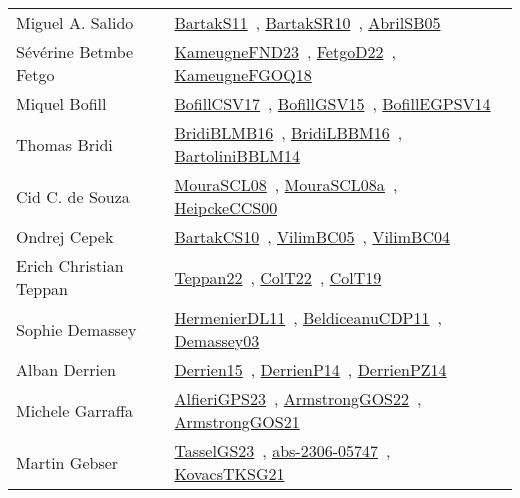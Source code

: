 {\begin{longtable}{p{4cm}p{20cm}}
Miguel A. Salido & \href{works/BartakS11.pdf}{BartakS11}~\cite{BartakS11}, \href{works/BartakSR10.pdf}{BartakSR10}~\cite{BartakSR10}, \href{works/AbrilSB05.pdf}{AbrilSB05}~\cite{AbrilSB05}\\
S{\'{e}}v{\'{e}}rine Betmbe Fetgo & \href{works/KameugneFND23.pdf}{KameugneFND23}~\cite{KameugneFND23}, \href{works/FetgoD22.pdf}{FetgoD22}~\cite{FetgoD22}, \href{works/KameugneFGOQ18.pdf}{KameugneFGOQ18}~\cite{KameugneFGOQ18}\\
Miquel Bofill & \href{works/BofillCSV17.pdf}{BofillCSV17}~\cite{BofillCSV17}, \href{works/BofillGSV15.pdf}{BofillGSV15}~\cite{BofillGSV15}, \href{works/BofillEGPSV14.pdf}{BofillEGPSV14}~\cite{BofillEGPSV14}\\
Thomas Bridi & \href{works/BridiBLMB16.pdf}{BridiBLMB16}~\cite{BridiBLMB16}, \href{works/BridiLBBM16.pdf}{BridiLBBM16}~\cite{BridiLBBM16}, \href{works/BartoliniBBLM14.pdf}{BartoliniBBLM14}~\cite{BartoliniBBLM14}\\
Cid C. de Souza & \href{works/MouraSCL08.pdf}{MouraSCL08}~\cite{MouraSCL08}, \href{works/MouraSCL08a.pdf}{MouraSCL08a}~\cite{MouraSCL08a}, \href{works/HeipckeCCS00.pdf}{HeipckeCCS00}~\cite{HeipckeCCS00}\\
Ondrej Cepek & \href{works/BartakCS10.pdf}{BartakCS10}~\cite{BartakCS10}, \href{works/VilimBC05.pdf}{VilimBC05}~\cite{VilimBC05}, \href{works/VilimBC04.pdf}{VilimBC04}~\cite{VilimBC04}\\
Erich Christian Teppan & \href{works/Teppan22.pdf}{Teppan22}~\cite{Teppan22}, \href{works/ColT22.pdf}{ColT22}~\cite{ColT22}, \href{works/ColT19.pdf}{ColT19}~\cite{ColT19}\\
Sophie Demassey & \href{works/HermenierDL11.pdf}{HermenierDL11}~\cite{HermenierDL11}, \href{works/BeldiceanuCDP11.pdf}{BeldiceanuCDP11}~\cite{BeldiceanuCDP11}, \href{}{Demassey03}~\cite{Demassey03}\\
Alban Derrien & \href{}{Derrien15}~\cite{Derrien15}, \href{works/DerrienP14.pdf}{DerrienP14}~\cite{DerrienP14}, \href{works/DerrienPZ14.pdf}{DerrienPZ14}~\cite{DerrienPZ14}\\
Michele Garraffa & \href{works/AlfieriGPS23.pdf}{AlfieriGPS23}~\cite{AlfieriGPS23}, \href{works/ArmstrongGOS22.pdf}{ArmstrongGOS22}~\cite{ArmstrongGOS22}, \href{works/ArmstrongGOS21.pdf}{ArmstrongGOS21}~\cite{ArmstrongGOS21}\\
Martin Gebser & \href{works/TasselGS23.pdf}{TasselGS23}~\cite{TasselGS23}, \href{works/abs-2306-05747.pdf}{abs-2306-05747}~\cite{abs-2306-05747}, \href{works/KovacsTKSG21.pdf}{KovacsTKSG21}~\cite{KovacsTKSG21}\\

\end{longtable}}
